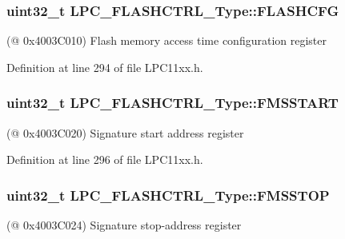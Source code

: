 \subsubsection[{\texorpdfstring{F\+L\+A\+S\+H\+C\+FG}{FLASHCFG}}]{ uint32\+\_\+t L\+P\+C\+\_\+\+F\+L\+A\+S\+H\+C\+T\+R\+L\+\_\+\+Type\+::\+F\+L\+A\+S\+H\+C\+FG}\hypertarget{group___l_p_c11xx___definitions_ga935218d47a7a49f946adf9eab4c879f8}{}\label{group___l_p_c11xx___definitions_ga935218d47a7a49f946adf9eab4c879f8}
(@ 0x4003\+C010) Flash memory access time configuration register 

Definition at line 294 of file L\+P\+C11xx.\+h.

\subsubsection[{\texorpdfstring{F\+M\+S\+S\+T\+A\+RT}{FMSSTART}}]{ uint32\+\_\+t L\+P\+C\+\_\+\+F\+L\+A\+S\+H\+C\+T\+R\+L\+\_\+\+Type\+::\+F\+M\+S\+S\+T\+A\+RT}\hypertarget{group___l_p_c11xx___definitions_ga3f34045f09782996b016d4d28fc59385}{}\label{group___l_p_c11xx___definitions_ga3f34045f09782996b016d4d28fc59385}
(@ 0x4003\+C020) Signature start address register 

Definition at line 296 of file L\+P\+C11xx.\+h.

\subsubsection[{\texorpdfstring{F\+M\+S\+S\+T\+OP}{FMSSTOP}}]{ uint32\+\_\+t L\+P\+C\+\_\+\+F\+L\+A\+S\+H\+C\+T\+R\+L\+\_\+\+Type\+::\+F\+M\+S\+S\+T\+OP}\hypertarget{group___l_p_c11xx___definitions_ga23c075053616e15f2f53435deb3bfcd0}{}\label{group___l_p_c11xx___definitions_ga23c075053616e15f2f53435deb3bfcd0}
(@ 0x4003\+C024) Signature stop-\/address register 

